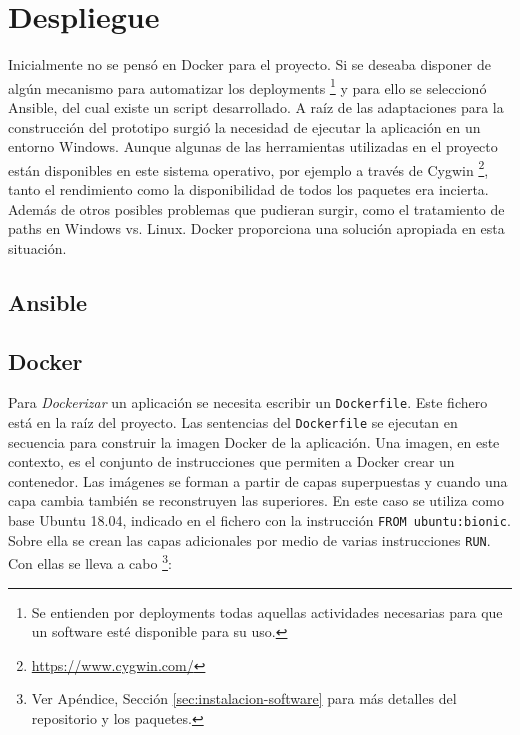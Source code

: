 \section{Despliegue}

Inicialmente no se pensó en Docker para el proyecto. Si se deseaba disponer de algún mecanismo para automatizar los deployments \footnote{Se entienden por deployments todas aquellas actividades necesarias para que un software esté disponible para su uso.} y para ello se seleccionó Ansible, del cual existe un script desarrollado. A raíz de las adaptaciones para la construcción del prototipo surgió la necesidad de ejecutar la aplicación en un entorno Windows. Aunque algunas de las herramientas utilizadas en el proyecto están disponibles en este sistema operativo, por ejemplo a través de Cygwin \footnote{\url{https://www.cygwin.com/}}, tanto el rendimiento como la disponibilidad de todos los paquetes era incierta. Además de otros posibles problemas que pudieran surgir, como el tratamiento de paths en Windows vs. Linux. Docker proporciona una solución apropiada en esta situación.

\subsection{Ansible}



\subsection{Docker}

Para \emph{Dockerizar} un aplicación se necesita escribir un \verb|Dockerfile|. Este fichero está en la raíz del proyecto. Las sentencias del \verb|Dockerfile| se ejecutan en secuencia para construir la imagen Docker de la aplicación. Una imagen, en este contexto, es el conjunto de instrucciones que permiten a Docker crear un contenedor. Las imágenes se forman a partir de capas superpuestas y cuando una capa cambia también se reconstruyen las superiores. En este caso se utiliza como base Ubuntu 18.04, indicado en el fichero con la instrucción \verb|FROM ubuntu:bionic|. Sobre ella se crean las capas adicionales por medio de varias instrucciones \verb|RUN|. Con ellas se lleva a cabo \footnote{Ver Apéndice, Sección \ref{sec:instalacion-software} para más detalles del repositorio y los paquetes.}:

